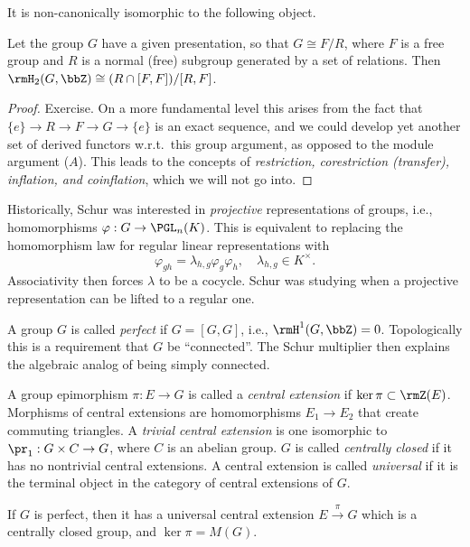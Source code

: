 It is non-canonically isomorphic to the following object.

\begin{thm}
    Let the group $G$ have a given presentation, so that $G\cong F\slash R$, where $F$ is a free group and $R$ is a normal (free) subgroup generated by a set of relations. Then $\rmH_2(G,\bbZ)\cong (R\cap [F,F])\slash [R,F]$.
\end{thm}
\begin{proof}
    Exercise. On a more fundamental level this arises from the fact that $\{e\}\to R\to F\to G\to \{e\}$ is an exact sequence, and we could develop yet another set of derived functors w.r.t.\ this group argument, as opposed to the module argument ($A$). This leads to the concepts of \emph{restriction, corestriction (transfer), inflation, and coinflation}, which we will not go into.
\end{proof}

Historically, Schur was interested in \emph{projective} representations of groups, i.e., homomorphisms $\varphi:G\to \PGL_n(K)$. This is equivalent to replacing the homomorphism law for regular linear representations with
\[\varphi_{gh}=\lambda_{h,g}\varphi_g\varphi_h,\quad\lambda_{h,g}\in K^\times.\]
Associativity then forces $\lambda$ to be a cocycle. Schur was studying when a projective representation can be lifted to a regular one. 

A group $G$ is called \emph{perfect} if $G=[G,G]$, i.e., $\rmH^1(G,\bbZ)=0$. Topologically this is a requirement that $G$ be ``connected''. The Schur multiplier then explains the algebraic analog of being simply connected. 

\begin{defn}
    A group epimorphism $\pi:E\to G$ is called a \emph{central extension} if $\ker\pi\subset \rmZ(E)$.  Morphisms of central extensions are homomorphisms $E_1\to E_2$ that create commuting triangles. A \emph{trivial central extension} is one isomorphic to $\pr_1:G\times C\to G$, where $C$ is an abelian group. $G$ is called \emph{centrally closed} if it has no nontrivial central extensions. A central extension is called \emph{universal} if it is the terminal object in the category of central extensions of $G$.
\end{defn}

\begin{thm}[Schur]
    If $G$ is perfect, then it has a universal central extension $E\overset{\pi}{\to} G$ which is a centrally closed group, and $\ker\pi =M(G)$.
\end{thm}

